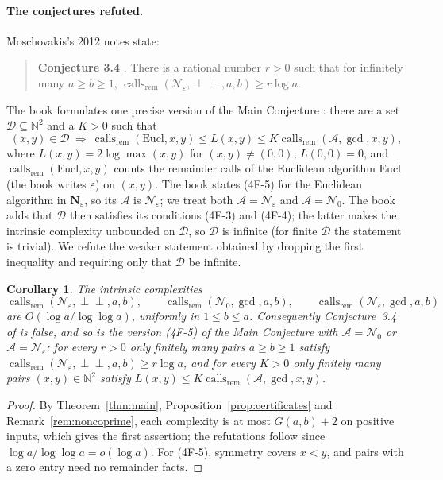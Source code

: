 \documentclass[11pt]{article}
\newtheorem{corollary}[theorem]{Corollary}
\theoremstyle{remark}
\newcommand{\rem}{\operatorname{rem}}
\newcommand{\calls}{\operatorname{calls}}
\newcommand{\coprime}{\perp\!\!\!\perp}
\begin{document}
\paragraph{The conjectures refuted.}
Moschovakis's 2012 notes state:
\begin{quote}
\textbf{Conjecture 3.4} \cite[p.~19]{moschovakis2012}. There is a rational number
$r>0$ such that for infinitely many $a\geq b\geq1$,
$\calls_{\rem}(\mathcal N_\varepsilon,\coprime,a,b)\geq r\log a$.
\end{quote}
The book formulates one precise version of the Main Conjecture
\cite[p.~151]{moschovakis2019}: there are a set $\mathcal D\subseteq\mathbb N^2$
and a $K>0$ such that
\[
(x,y)\in\mathcal D\ \Longrightarrow\
\calls_{\rem}(\mathrm{Eucl},x,y)\leq L(x,y)\leq K\calls_{\rem}(\mathcal A,\gcd,x,y),
\tag{4F-5}
\]
where $L(x,y)=2\log\max(x,y)$ for $(x,y)\neq(0,0)$, $L(0,0)=0$, and
$\calls_{\rem}(\mathrm{Eucl},x,y)$ counts
the remainder calls of the Euclidean algorithm $\mathrm{Eucl}$ (the book writes
$\varepsilon$) on $(x,y)$. The book states (4F-5) for the Euclidean algorithm
in $\mathbf N_\varepsilon$, so its $\mathcal A$ is $\mathcal N_\varepsilon$;
we treat both $\mathcal A=\mathcal N_\varepsilon$ and $\mathcal A=\mathcal N_0$.
The book adds that $\mathcal D$ then satisfies its conditions (4F-3) and
(4F-4); the latter makes the intrinsic complexity unbounded on $\mathcal D$,
so $\mathcal D$ is infinite (for finite $\mathcal D$ the statement is
trivial). We refute the weaker statement obtained by dropping the first
inequality and requiring only that $\mathcal D$ be infinite.

\begin{corollary}\label{cor:refute}
The intrinsic complexities
\[
\calls_{\rem}(\mathcal N_\varepsilon,\coprime,a,b),\qquad
\calls_{\rem}(\mathcal N_0,\gcd,a,b),\qquad
\calls_{\rem}(\mathcal N_\varepsilon,\gcd,a,b)
\]
are $O(\log a/\log\log a)$, uniformly in $1\leq b\leq a$. Consequently Conjecture~3.4 of
\cite{moschovakis2012} is false, and so is the version (4F-5) of the Main
Conjecture with $\mathcal A=\mathcal N_0$ or $\mathcal A=\mathcal N_\varepsilon$:
for every $r>0$ only finitely many pairs $a\geq b\geq1$ satisfy
$\calls_{\rem}(\mathcal N_\varepsilon,\coprime,a,b)\geq r\log a$, and for every
$K>0$ only finitely many pairs $(x,y)\in\mathbb N^2$ satisfy
$L(x,y)\leq K\calls_{\rem}(\mathcal A,\gcd,x,y)$.
\end{corollary}
\begin{proof}
By Theorem~\ref{thm:main}, Proposition~\ref{prop:certificates} and
Remark~\ref{rem:noncoprime}, each complexity is at most $G(a,b)+2$ on
positive inputs, which gives the first assertion; the refutations follow
since $\log a/\log\log a=o(\log a)$. For (4F-5), symmetry covers $x<y$, and
pairs with a zero entry need no remainder facts.
\end{proof}
\end{document}
